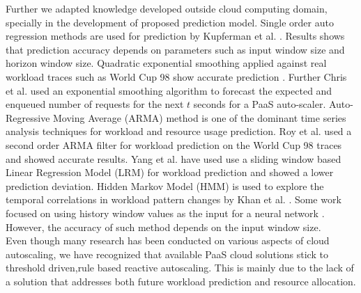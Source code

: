 Further we adapted knowledge developed outside cloud computing domain, specially in the development of proposed prediction model. Single order auto regression methods are used for prediction by Kupferman et al. \cite{Kupferman_2009}. Results shows that prediction accuracy depends on parameters such as input window size and horizon window size. Quadratic exponential smoothing applied against real workload traces such as World Cup 98 \cite{WorldCup_1998} show accurate prediction \cite{Mi_2010}. Further Chris et al. \cite{Bunch_2012} used an exponential smoothing algorithm to forecast the expected and enqueued number of requests for the next $t$ seconds for a PaaS auto-scaler. Auto-Regressive Moving Average (ARMA) method is one of the dominant time series analysis techniques for workload and resource usage prediction. Roy et al. \cite{Roy_2011} used a second order ARMA filter for workload prediction on the World Cup 98 traces and showed accurate results. Yang et al. \cite{Yang_2013} have used use a sliding window based Linear Regression Model (LRM) for workload prediction and showed a lower prediction deviation. Hidden Markov Model (HMM) is used to explore the temporal correlations in workload pattern changes by Khan et al. \cite{Khan_2012}. Some work focused on using history window values as the input for a neural network \cite{Islam_2012}. However, the accuracy of such method depends on the input window size.\\

Even though many research has been conducted on various aspects of cloud autoscaling, we have recognized that available PaaS cloud solutions stick to threshold driven,rule based reactive autoscaling. This is mainly due to the lack of a solution that addresses both future workload prediction and resource allocation.